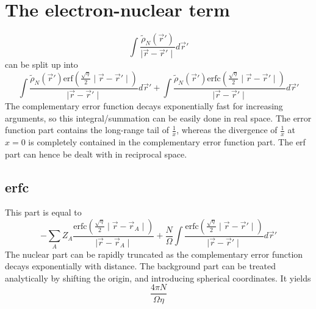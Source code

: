 \documentclass[11pt,a4paper]{article}
\begin{document}
\section{The electron-nuclear term}
\begin{equation}
\int \frac{\tilde{\rho}_N(\vec{r}')}{\mid \vec{r} - \vec{r}' \mid} d\vec{r}' \label{gjgj}
\end{equation}
can be split up into
\begin{equation}
\int \frac{\tilde{\rho}_N(\vec{r}') \text{erf}\left( \frac{\sqrt{\eta}}{2} \mid \vec{r} - \vec{r}' \mid \right)}{\mid \vec{r} - \vec{r}' \mid} d\vec{r}' + \int \frac{\tilde{\rho}_N(\vec{r}') \text{erfc}\left( \frac{\sqrt{\eta}}{2} \mid \vec{r} - \vec{r}' \mid \right)}{\mid \vec{r} - \vec{r}' \mid} d\vec{r}'
\end{equation}
The complementary error function decays exponentially fast for increasing arguments, so this integral/summation can be easily done in real space. The error function part contains the long-range tail of $\frac{1}{x}$, whereas the divergence of $\frac{1}{x}$ at $x=0$ is completely contained in the complementary error function part. The erf part can hence be dealt with in reciprocal space.
\subsection{erfc}
This part is equal to
\begin{equation}
- \sum\limits_A Z_A \frac{\text{erfc}\left( \frac{\sqrt{\eta}}{2} \mid \vec{r} - \vec{r}_A \mid \right)}{\mid \vec{r} - \vec{r}_A \mid} + \frac{N}{\Omega} \int  \frac{\text{erfc}\left( \frac{\sqrt{\eta}}{2} \mid \vec{r} - \vec{r}' \mid \right)}{\mid \vec{r} - \vec{r}' \mid} d\vec{r}'
\end{equation}
The nuclear part can be rapidly truncated as the complementary error function decays exponentially with distance. The background part can be treated analytically by shifting the origin, and introducing spherical coordinates. It yields
\begin{equation}
\frac{4 \pi N}{\Omega \eta}
\end{equation}
\end{document}
